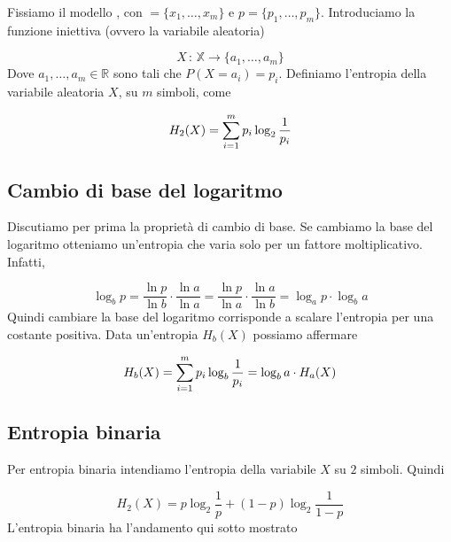 \documentclass[12pt]{report}
\begin{document}
    Fissiamo il modello \modello, con \sorgente$=\{x_1,\dots,x_m\}$ e $p = \{p_1,\dots,p_m\}$. Introduciamo la funzione iniettiva (ovvero la variabile aleatoria)

    $$X\,:\, \mathbb{X} \rightarrow \{a_1,\dots,a_m\}$$
    Dove $a_1,\dots,a_m \in \mathbb{R}$ sono tali che $P(X = a_i) = p_i$. Definiamo l'entropia della variabile aleatoria $X$, su $m$ simboli, come

    $$H_2(X) = \sum_{i=1}^{m} p_i \log_2{\frac{1}{p_i}}$$

    \subsection{Cambio di base del logaritmo}

    Discutiamo per prima la proprietà di cambio di base. Se cambiamo la base del logaritmo otteniamo un'entropia che varia solo per un fattore moltiplicativo. Infatti,

    $$\log_b{p} = \frac{\ln{p}}{\ln{b}} \cdot \frac{\ln{a}}{\ln{a}} = \frac{\ln{p}}{\ln{a}} \cdot \frac{\ln{a}}{\ln{b}} = \log_a{p} \cdot \log_b{a}$$
    Quindi cambiare la base del logaritmo corrisponde a scalare l'entropia per una costante positiva. Data un'entropia $H_b(X)$ possiamo affermare

    $$H_b(X) = \sum_{i=1}^{m} p_i \log_b{\frac{1}{p_i}} = \log_b{a} \cdot H_a(X)$$

    \subsection{Entropia binaria}

    Per entropia binaria intendiamo l'entropia della variabile $X$ su $2$ simboli. Quindi

    $$H_2(X) = p\log_2{\frac{1}{p}} + (1-p)\log_2{\frac{1}{1-p}}$$
    L'entropia binaria ha l'andamento qui sotto mostrato

    \vspace{10px}


    \noindent
\end{document}
